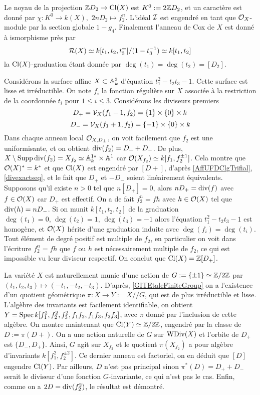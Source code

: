 \begin{ex}
Le noyau de la projection $\mathbb{Z} D_2\rightarrow \operatorname{Cl}(X)$ est $K^0:=2\mathbb{Z} D_2$, et un caractère est donné par $\chi: K^0\rightarrow k(X),\,\,2nD_2\mapsto f_2^n$. L'idéal $\mathcal{I}$ est engendré en tant que $\mathcal{O}_X$-module par la section globale $1-g_4$. Finalement l'anneau de Cox de $X$ est donné à ismorphisme près par
$$\mathcal{R}(X)\simeq k[t_1,t_2,t_3^{\pm}]/(1-t_3^{-1})\simeq k[t_1,t_2]$$
la $\operatorname{Cl}(X)$-graduation étant donnée par $\deg(t_1)=\deg(t_2)=[D_2]$.
\end{ex}

\begin{ex}\label{CoxRingEx3}
Considérons la surface affine $X\subset \mathbb{A}_k^3$ d'équation $t_1^2-t_2t_3-1$. Cette surface est lisse et irréductible. On note $f_i$ la fonction régulière sur $X$ associée à la restriction de la coordonnée $t_i$ pour $1\leq i\leq 3$. Considérons les diviseurs premiers
$$D_+=\mathcal{V}_X(f_1-1,f_2)=\lbrace 1\rbrace\times\lbrace 0\rbrace\times k$$
$$D_-=\mathcal{V}_X(f_1+1,f_2)=\lbrace -1\rbrace\times\lbrace 0\rbrace\times k$$
Dans chaque anneau local $\mathcal{O}_{X,D_\pm}$, on voit facilement que $f_2$ est une uniformisante, et on obtient $\operatorname{div}(f_2)=D_++D_-$. De plus, $X\setminus\operatorname{Supp} \operatorname{div}(f_2)=X_{f_2}\simeq \mathbb{A}^{1*}_k\times \mathbb{A}^1$ car $\mathcal{O}(X_{f_2})\simeq k[f_1,f_2^{\pm 1}]$. Cela montre que $\mathcal{O}(X)^*=k^*$ et que $\operatorname{Cl}(X)$ est engendré par $[D+]$, d'après \ref{AffUFDClgTrifial}, \ref{divexactseq}, et le fait que $D_+$ et $-D_-$ soient linéairement équivalents. Supposons qu'il existe $n>0$ tel que $n[D_+]=0$, alors $nD_+=\operatorname{div}(f)$ avec $f\in\mathcal{O}(X)$ car $D_+$ est effectif. On a de fait $f_2^n=fh$ avec $h\in\mathcal{O}(X)$ tel que $\operatorname{div}(h)=nD_-$. Si on munit $k[t_1,t_2,t_2]$ de la graduation $\deg(t_1)=0,\,\deg(t_2)=1,\,\deg(t_3)=-1$ alors l'équation $t_1^2-t_2t_3-1$ est homogène, et $\mathcal{O}(X)$ hérite d'une graduation induite avec $\deg(f_i)=\deg(t_i)$. Tout élément de degré positif est multiple de $f_2$, en particulier on voit dans l'écriture $f_2^n=fh$ que $f$ ou $h$ est nécessairement multiple de $f_2$, ce qui est impossible vu leur diviseur respectif. On conclut que $\operatorname{Cl}(X)=\mathbb{Z}[D_+]$.

La variété $X$ est naturellement munie d'une action de $G:=\lbrace \pm 1\rbrace\simeq \mathbb{Z}/2\mathbb{Z}$ par $(t_1,t_2,t_3)\mapsto (-t_1,-t_2,-t_3)$. D'après, \ref{GITEtaleFiniteGroup} on a l'existence d'un quotient géométrique $\pi:X\rightarrow Y:=X//G$, qui est de plus irréductible et lisse. L'algèbre des invariants est facilement identifiable, on obtient  $Y=\operatorname{Spec} k[f_1^2,f_2^2,f_3^2,f_1f_2,f_1f_3,f_2f_3]$, avec $\pi$ donné par l'inclusion de cette algèbre. On montre maintenant que $\operatorname{Cl}(Y)\simeq \mathbb{Z}/2\mathbb{Z}$, engendré par la classe de $D:=\pi(D+)$. On a une action naturelle de $G$ sur $\operatorname{WDiv}(X)$ et l'orbite de $D_+$ est $\lbrace D_-,D_+\rbrace$. Ainsi, $G$ agit sur $X_{f_2}$ et le quotient $\pi(X_{f_2})$ a pour algèbre d'invariants $k[f_1^2,f_2^{\pm 2}]$. Ce dernier anneau est factoriel, on en déduit que $[D]$ engendre $\operatorname{Cl}(Y)$. Par ailleurs, $D$ n'est pas principal sinon $\pi^*(D)=D_++D_-$ serait le diviseur d'une fonction $G$-invariante, ce qui n'est pas le cas. Enfin, comme on a $2D=\operatorname{div}(f_2^2)$, le résultat est démontré.


\end{ex}
